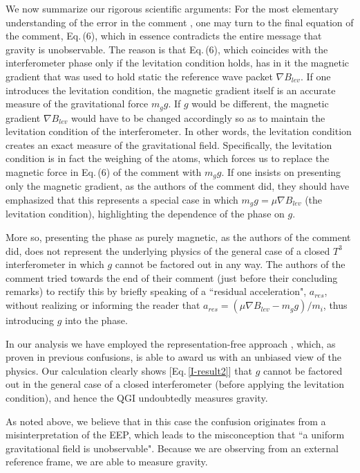 \documentclass[aps,prx,onecolumn,superscriptaddress,longbibliography]{revtex4-2}
\begin{document}
We now summarize our rigorous scientific arguments:
For the most elementary understanding of the error in the comment \cite{QGI-comment}, one may turn to the final equation of the comment, Eq.\,(6), which in essence contradicts the entire message that gravity is unobservable. The reason is that Eq.\,(6), which coincides with the interferometer phase only if the levitation condition holds, has in it the magnetic gradient that was used to hold static the reference wave packet $\nabla B_{lev}$. If one introduces the levitation condition, the magnetic gradient itself is an accurate measure of the gravitational force $m_g g$. If $g$ would be different, the magnetic gradient $\nabla B_{lev}$ would have to be changed accordingly so as to maintain the levitation condition of the interferometer. In other words, the levitation condition creates an exact measure of the gravitational field. Specifically, the levitation condition is in fact the weighing of the atoms, which forces us to replace the magnetic force in  Eq.\,(6) of the comment \cite{QGI-comment} with $m_g g$.
If one insists on presenting only the magnetic gradient, as the authors of the comment did, they should have emphasized that this represents a special case in which $m_g g = \mu \nabla B_{lev}$ (the levitation condition), highlighting the dependence of the phase on $g$.

More so, presenting the phase as purely magnetic, as the authors of the comment did, does not represent the underlying physics of the general case of a closed $T^3$ interferometer in which $g$ cannot be factored out in any way. The authors of the comment tried towards the end of their comment (just before their concluding remarks) to rectify this by briefly speaking of a ``residual acceleration", $a_{res}$, without realizing or informing the reader that $a_{res}=(\mu \nabla B_{lev}-m_g g)/m_i $, thus introducing $g$ into the phase.

In our analysis we have employed the representation-free approach \cite{Schleich-NJP,Schleich-PRL}, which, as proven in previous confusions, is able to award us with an unbiased view of the physics. Our calculation clearly shows [Eq.\,\eqref{I-result2}] that $g$ cannot be factored out in the general case of a closed interferometer (before applying the levitation condition), and hence the QGI undoubtedly measures gravity.

As noted above, we believe that in this case the confusion originates from a misinterpretation of the EEP, which leads to the misconception that ``a uniform gravitational field is unobservable". Because we are observing from an external reference frame, we are able to measure gravity.
\end{document}
